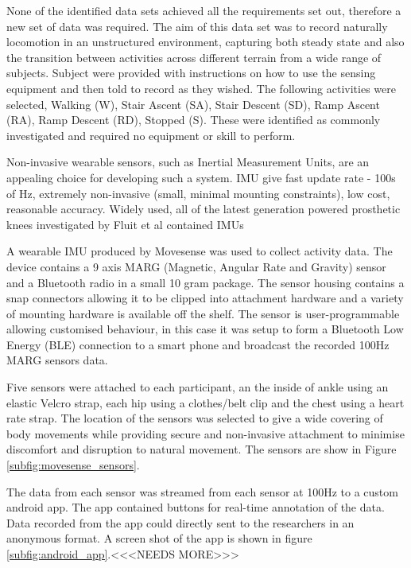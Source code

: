\documentclass[sensors,article,submit,moreauthors,pdftex]{Definitions/mdpi}
\begin{document}
None of the identified data sets achieved all the requirements set out, therefore a new set of data was required. The aim of this data set was to record naturally locomotion in an unstructured environment, capturing both steady state and also the transition between activities across different terrain from a wide range of subjects. Subject were provided with instructions on how to use the sensing equipment and then told to record as they wished. The following activities were selected, Walking (W), Stair Ascent (SA), Stair Descent (SD), Ramp Ascent (RA), Ramp Descent (RD), Stopped (S). These were identified as commonly investigated and required no equipment or skill to perform. 

Non-invasive wearable sensors, such as Inertial Measurement Units, are an appealing choice for developing such a system. IMU give fast update rate - 100s of Hz, extremely non-invasive (small, minimal mounting constraints), low cost, reasonable accuracy. Widely used, all of the latest generation powered prosthetic knees investigated by Fluit et al contained IMUs \cite{Fluit2020}

A wearable IMU produced by Movesense was used to collect activity data. The device contains a 9 axis MARG (Magnetic, Angular Rate and Gravity) sensor and a Bluetooth radio in a small 10 gram package. The sensor housing contains a snap connectors allowing it to be clipped into attachment hardware and a variety of mounting hardware is available off the shelf. The sensor is user-programmable allowing customised behaviour, in this case it was setup to form a Bluetooth Low Energy (BLE) connection to a smart phone and broadcast the recorded 100Hz MARG sensors data. 

Five sensors were attached to each participant, an the inside of ankle using an elastic Velcro strap, each hip using a clothes/belt clip and the chest using a heart rate strap. The location of the sensors was selected to give a wide covering of body movements while providing secure and non-invasive attachment to minimise discomfort and disruption to natural movement. The sensors are show in Figure \ref{subfig:movesense_sensors}.

The data from each sensor was streamed from each sensor at 100Hz to a custom android app. The app contained buttons for real-time annotation of the data. Data recorded from the app could directly sent to the researchers in an anonymous format. A screen shot of the app is shown in figure \ref{subfig:android_app}.<<<NEEDS MORE>>>
\end{document}
